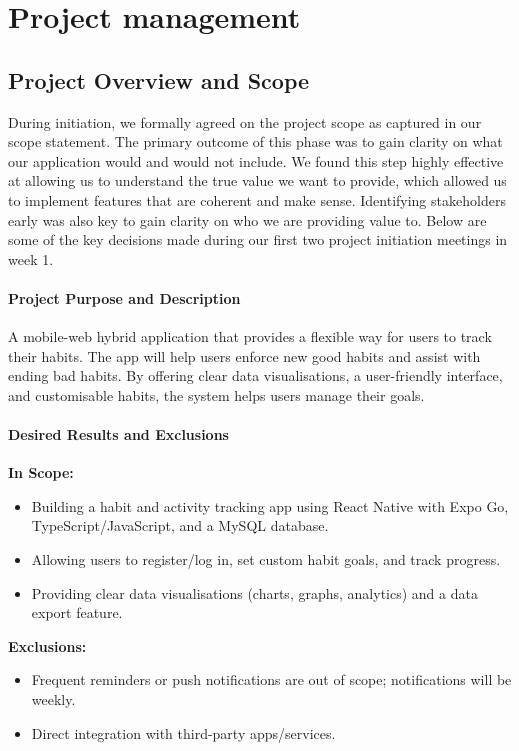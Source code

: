 \chapter{Project management}
\label{chap:project-management}

\section{Project Overview and Scope}
\label{sect:project-overview}
During initiation, we formally agreed on the project scope as captured in our scope statement. The primary outcome of this phase was to gain clarity on what our application would and would not include. We found this step highly effective at allowing us to understand the true value we want to provide, which allowed us to implement features that are coherent and make sense. Identifying stakeholders early was also key to gain clarity on who we are providing value to. Below are some of the key decisions made during our first two project initiation meetings in week 1.

\subsubsection{Project Purpose and Description}
A mobile-web hybrid application that provides a flexible way for users to track their habits. The app will help users enforce new good habits and assist with ending bad habits. By offering clear data visualisations, a user-friendly interface, and customisable habits, the system helps users manage their goals.

\subsubsection{Desired Results and Exclusions}
\textbf{In Scope:}
\begin{itemize}
    \item Building a habit and activity tracking app using React Native with Expo Go, TypeScript/JavaScript, and a MySQL database.
    \item Allowing users to register/log in, set custom habit goals, and track progress.
    \item Providing clear data visualisations (charts, graphs, analytics) and a data export feature.
\end{itemize}

\textbf{Exclusions:}
\begin{itemize}
    \item Frequent reminders or push notifications are out of scope; notifications will be weekly.
    \item Direct integration with third-party apps/services.
\end{itemize}

